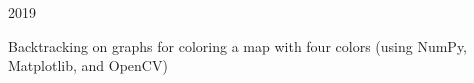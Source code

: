 \begin{cvprojects}


  \cvproject
    {} %
    {} %
    {} %
    {2019} %
    {
      \begin{cvitems} %
        \item {Backtracking on graphs for coloring a map with four colors (using NumPy, Matplotlib, and OpenCV)}
      \end{cvitems}
    }





\end{cvprojects}